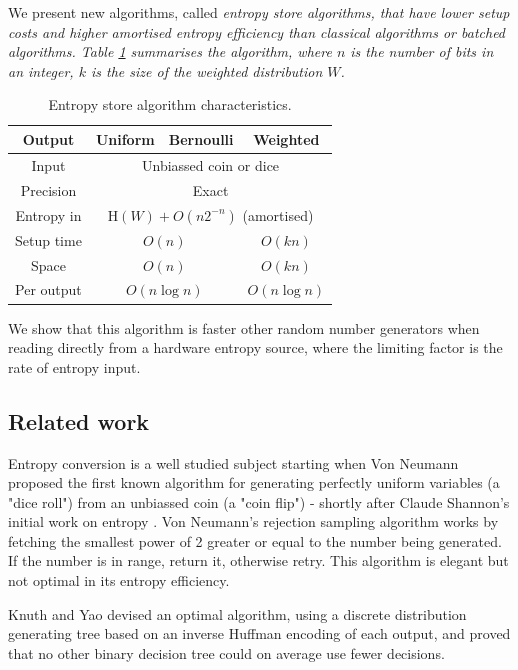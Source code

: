 \documentclass[lettersize,journal]{IEEEtran}
\newcommand{\Entropy}{\mathrm{H}}
\newcommand{\entropy}[1]{\Entropy(#1)}
\begin{document}
We present new algorithms, called \em entropy store algorithms\em, that have lower setup costs and higher amortised entropy efficiency than classical algorithms or batched algorithms. Table \ref{tab:entropy-store} summarises the algorithm, where $n$ is the number of bits in an integer, $k$ is the size of the weighted distribution $W$.

\begin{table}[h!]
\centering
\begin{tabular}{|c|c|c|c|}
\hline
Output & Uniform & Bernoulli & Weighted \\
\hline
Input & \multicolumn{3}{|c|}{Unbiassed coin or dice} \\
Precision & \multicolumn{3}{|c|}{Exact} \\
Entropy in & \multicolumn{3}{|c|}{$\entropy{W}+O(n2^{-n})$ (amortised)} \\
\hline
Setup time & \multicolumn{2}{|c|}{$O(n)$} & $O(kn)$ \\
Space & \multicolumn{2}{|c|}{$O(n)$} & $O(kn)$ \\
Per output & \multicolumn{2}{|c|}{$O(n \log n)$} & $O(n \log n)$ \\
\hline
\end{tabular}
\caption{Entropy store algorithm characteristics.}
    \label{tab:entropy-store}
\end{table}

We show that this algorithm is faster other random number generators when reading directly from a hardware entropy source, where the limiting factor is the rate of entropy input.

\subsection{Related work}

Entropy conversion is a well studied subject starting when Von Neumann \cite{neumann51} proposed the first known algorithm for generating perfectly uniform variables (a "dice roll") from an unbiassed coin (a "coin flip") - shortly after Claude Shannon's initial work on entropy \cite{shannon1948mathematical}. Von Neumann's rejection sampling algorithm works by fetching the smallest power of 2 greater or equal to the number being generated. If the number is in range, return it, otherwise retry. This algorithm is elegant but not optimal in its entropy efficiency.

Knuth and Yao \cite{knuth1976complexity} devised an optimal algorithm, using a discrete distribution generating tree based on an inverse Huffman encoding \cite{huffman52} of each output, and proved that no other binary decision tree could on average use fewer decisions.
\end{document}
